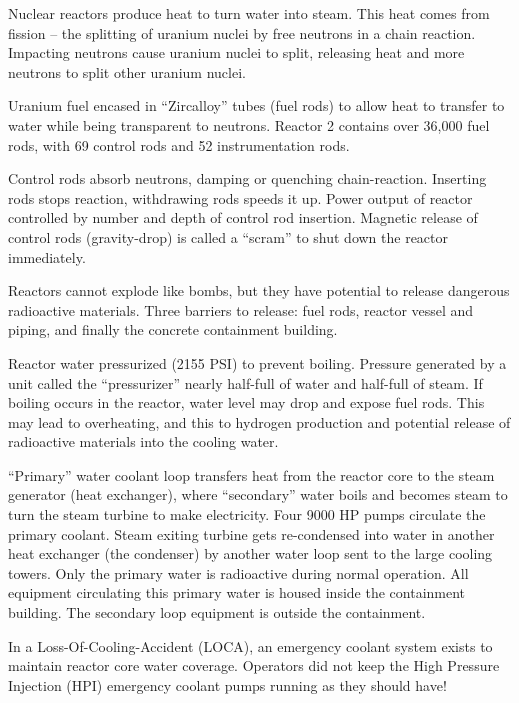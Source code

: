 \vskip 10pt

Nuclear reactors produce heat to turn water into steam.  This heat comes from fission -- the splitting of uranium nuclei by free neutrons in a chain reaction.  Impacting neutrons cause uranium nuclei to split, releasing heat and more neutrons to split other uranium nuclei.

Uranium fuel encased in ``Zircalloy'' tubes (fuel rods) to allow heat to transfer to water while being transparent to neutrons.  Reactor 2 contains over 36,000 fuel rods, with 69 control rods and 52 instrumentation rods.  

Control rods absorb neutrons, damping or quenching chain-reaction.  Inserting rods stops reaction, withdrawing rods speeds it up.  Power output of reactor controlled by number and depth of control rod insertion.  Magnetic release of control rods (gravity-drop) is called a ``scram'' to shut down the reactor immediately.

Reactors cannot explode like bombs, but they have potential to release dangerous radioactive materials.  Three barriers to release: fuel rods, reactor vessel and piping, and finally the concrete containment building.

Reactor water pressurized (2155 PSI) to prevent boiling.  Pressure generated by a unit called the ``pressurizer'' nearly half-full of water and half-full of steam.  If boiling occurs in the reactor, water level may drop and expose fuel rods.  This may lead to overheating, and this to hydrogen production and potential release of radioactive materials into the cooling water.

``Primary'' water coolant loop transfers heat from the reactor core to the steam generator (heat exchanger), where ``secondary'' water boils and becomes steam to turn the steam turbine to make electricity.  Four 9000 HP pumps circulate the primary coolant.  Steam exiting turbine gets re-condensed into water in another heat exchanger (the condenser) by another water loop sent to the large cooling towers.  Only the primary water is radioactive during normal operation.  All equipment circulating this primary water is housed inside the containment building.  The secondary loop equipment is outside the containment.

In a Loss-Of-Cooling-Accident (LOCA), an emergency coolant system exists to maintain reactor core water coverage.  Operators did not keep the High Pressure Injection (HPI) emergency coolant pumps running as they should have!




